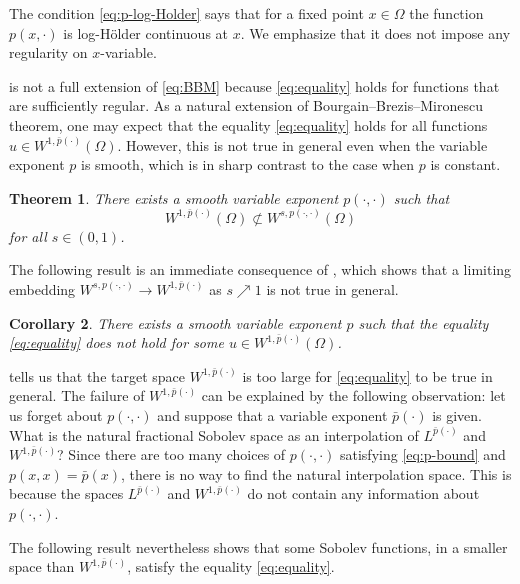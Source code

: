 \documentclass[11pt]{amsart}
\theoremstyle{plain}
\newtheorem{theorem}{Theorem}[section]
\newtheorem{corollary}[theorem]{Corollary}
\theoremstyle{definition}
\numberwithin{equation}{section}
\begin{document}
The condition \eqref{eq:p-log-Holder} says that for a fixed point $x \in \Omega$ the function $p(x, \cdot)$ is log-H\"older continuous at $x$. We emphasize that it does not impose any regularity on $x$-variable.

 is not a full extension of \eqref{eq:BBM} because \eqref{eq:equality} holds for functions that are sufficiently regular. As a natural extension of Bourgain--Brezis--Mironescu theorem, one may expect that the equality \eqref{eq:equality} holds for all functions $u \in W^{1, \bar{p}(\cdot)}(\Omega)$. However, this is not true in general even when the variable exponent $p$ is smooth, which is in sharp contrast to the case when $p$ is constant.

\begin{theorem} \label{thm:failure}
There exists a smooth variable exponent $p(\cdot, \cdot)$ such that
\begin{equation*}
W^{1, \bar{p}(\cdot)}(\Omega) \not\subset W^{s, p(\cdot, \cdot)}(\Omega)
\end{equation*}
for all $s \in (0,1)$.
\end{theorem}

The following result is an immediate consequence of , which shows that a limiting embedding $W^{s, p(\cdot, \cdot)} \to W^{1, \bar{p}(\cdot)}$ as $s \nearrow 1$ is not true in general.

\begin{corollary} \label{cor:failure}
There exists a smooth variable exponent $p$ such that the equality \eqref{eq:equality} does not hold for some $u \in W^{1, \bar{p}(\cdot)}(\Omega)$.
\end{corollary}

 tells us that the target space $W^{1, \bar{p}(\cdot)}$ is too large for \eqref{eq:equality} to be true in general. The failure of $W^{1, \bar{p}(\cdot)}$ can be explained by the following observation: let us forget about $p(\cdot, \cdot)$ and suppose that a variable exponent $\bar{p}(\cdot)$ is given. What is the natural fractional Sobolev space as an interpolation of $L^{\bar{p}(\cdot)}$ and $W^{1, \bar{p}(\cdot)}$? Since there are too many choices of $p(\cdot, \cdot)$ satisfying \eqref{eq:p-bound} and $p(x, x) = \bar{p}(x)$, there is no way to find the natural interpolation space. This is because the spaces $L^{\bar{p}(\cdot)}$ and $W^{1, \bar{p}(\cdot)}$ do not contain any information about $p(\cdot, \cdot)$.

The following result nevertheless shows that some Sobolev functions, in a smaller space than $W^{1, \bar{p}(\cdot)}$, satisfy the equality \eqref{eq:equality}.
\end{document}

